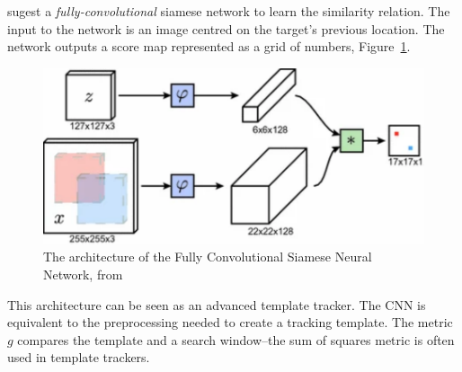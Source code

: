   \citeauthor{bertinetto2016} sugest a \textit{fully-convolutional} siamese network to learn the similarity relation.
  The input to the network is an image centred on the target's previous location.
  The network outputs a score map represented as a grid of numbers, Figure~\ref{fig:convSiamese}.

  \begin{figure}[!ht]
    \centering
    \includegraphics[scale = 0.6]{convSiamese.pdf}
    \caption{The architecture of the Fully Convolutional Siamese Neural Network, from \protect\cite{bertinetto2016}}
    \label{fig:convSiamese}
  \end{figure}

  This architecture can be seen as an advanced template tracker.
  The CNN is equivalent to the preprocessing needed to create a tracking template.
  The metric $g$ compares the template and a search window--the sum of squares metric is often used in template trackers.

